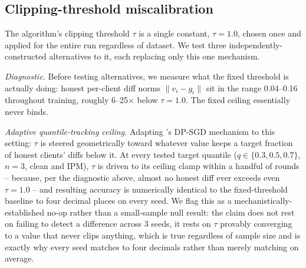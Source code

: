 \documentclass{article}
\begin{document}
\subsection{Clipping-threshold miscalibration}
\label{sec:clip}

The algorithm's clipping threshold $\tau$ is a single constant, $\tau{=}1.0$,
chosen once and applied for the entire run regardless of dataset. We test three
independently-constructed alternatives to it, each replacing only this one
mechanism.

\emph{Diagnostic.} Before testing alternatives, we measure what the fixed
threshold is actually doing: honest per-client diff norms $\lVert v_i - g_i
\rVert$ sit in the range 0.04--0.16 throughout training, roughly 6--25$\times$
below $\tau{=}1.0$. The fixed ceiling essentially never binds.

\emph{Adaptive quantile-tracking ceiling.} Adapting \citet{andrew2021adaptive}'s
DP-SGD mechanism to this setting: $\tau$ is steered geometrically toward whatever
value keeps a target fraction of honest clients' diffs below it. At every tested
target quantile ($q \in \{0.3, 0.5, 0.7\}$, $n{=}3$, clean and IPM), $\tau$ is
driven to its ceiling clamp within a handful of rounds -- because, per the
diagnostic above, almost no honest diff ever exceeds even $\tau{=}1.0$ -- and
resulting accuracy is numerically identical to the fixed-threshold baseline to
four decimal places on every seed. We flag this as a mechanistically-established
no-op rather than a small-sample null result: the claim does not rest on
failing to detect a difference across 3 seeds, it rests on $\tau$ provably
converging to a value that never clips anything, which is true regardless of
sample size and is exactly why every seed matches to four decimals rather than
merely matching on average.
\end{document}
